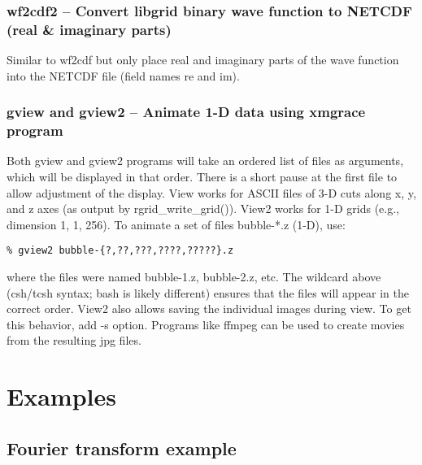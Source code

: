 \documentclass[12pt,letterpaper]{report}
\begin{document}
\subsection{wf2cdf2 -- Convert libgrid binary wave function to NETCDF (real \& imaginary parts)}

Similar to wf2cdf but only place real and imaginary parts of the wave function into the NETCDF file (field names re and im). 

\subsection{gview and gview2 -- Animate 1-D data using xmgrace program}

Both gview and gview2 programs will take an ordered list of files as arguments, which will be displayed in that order. There is a short pause at the first file to allow adjustment of the display. View works for ASCII files of 3-D cuts along x, y, and z axes (as output by rgrid\_write\_grid()). View2 works for 1-D grids (e.g., dimension 1, 1, 256). To animate a set of files bubble-*.z (1-D), use:
\begin{verbatim}
% gview2 bubble-{?,??,???,????,?????}.z
\end{verbatim}
where the files were named bubble-1.z, bubble-2.z, etc. The wildcard above (csh/tcsh syntax; bash is likely different) ensures that the files will appear in the correct order. View2 also allows saving the individual images during view. To get this behavior, add -s option. Programs like ffmpeg can be used to create movies from the resulting jpg files.

\chapter{Examples}

\section{Fourier transform example}
\end{document}
